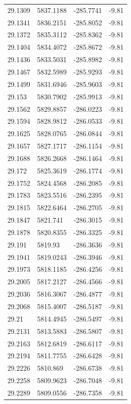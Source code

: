 \begin{table}[H]
\begin{tabular}{llll}
29.1309 & 5837.1188 & -285.7741 & -9.81 \\
29.1341 & 5836.2151 & -285.8052 & -9.81 \\
29.1372 & 5835.3112 & -285.8362 & -9.81 \\
29.1404 & 5834.4072 & -285.8672 & -9.81 \\
29.1436 & 5833.5031 & -285.8982 & -9.81 \\
29.1467 & 5832.5989 & -285.9293 & -9.81 \\
29.1499 & 5831.6946 & -285.9603 & -9.81 \\
29.153 & 5830.7902 & -285.9913 & -9.81 \\
29.1562 & 5829.8857 & -286.0223 & -9.81 \\
29.1594 & 5828.9812 & -286.0533 & -9.81 \\
29.1625 & 5828.0765 & -286.0844 & -9.81 \\
29.1657 & 5827.1717 & -286.1154 & -9.81 \\
29.1688 & 5826.2668 & -286.1464 & -9.81 \\
29.172 & 5825.3619 & -286.1774 & -9.81 \\
29.1752 & 5824.4568 & -286.2085 & -9.81 \\
29.1783 & 5823.5516 & -286.2395 & -9.81 \\
29.1815 & 5822.6464 & -286.2705 & -9.81 \\
29.1847 & 5821.741 & -286.3015 & -9.81 \\
29.1878 & 5820.8355 & -286.3325 & -9.81 \\
29.191 & 5819.93 & -286.3636 & -9.81 \\
29.1941 & 5819.0243 & -286.3946 & -9.81 \\
29.1973 & 5818.1185 & -286.4256 & -9.81 \\
29.2005 & 5817.2127 & -286.4566 & -9.81 \\
29.2036 & 5816.3067 & -286.4877 & -9.81 \\
29.2068 & 5815.4007 & -286.5187 & -9.81 \\
29.21 & 5814.4945 & -286.5497 & -9.81 \\
29.2131 & 5813.5883 & -286.5807 & -9.81 \\
29.2163 & 5812.6819 & -286.6117 & -9.81 \\
29.2194 & 5811.7755 & -286.6428 & -9.81 \\
29.2226 & 5810.869 & -286.6738 & -9.81 \\
29.2258 & 5809.9623 & -286.7048 & -9.81 \\
29.2289 & 5809.0556 & -286.7358 & -9.81 \\

\end{tabular}
\end{table}
